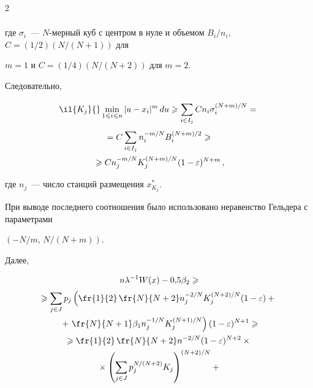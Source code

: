 \begin{multicols}{2}
\begin{multline*}
\end{multline*}


где $\sigma_i$~--- $N$-мерный куб с центром в нуле и объемом $B_i/n_i$, $C=(1/2)(N/(N+1))$ для


$m=1$ и $C=(1/4) (N/(N+2))$ для $m=2$.





Следовательно,


\begin{multline*}


\il{K_j}{}\minl{1\leqslant i\leqslant n}|u-x_i|^m\,du \geqslant


\suml{i\in I_j}{}C n_i \sigma_i^{(N+m)/N}= {}\\


{}=


C\suml{i\in I_j}{}n_i^{-m/N}B_i^{(N+m)/2}\geqslant {}\\


{}\geqslant


Cn_j^{-m/N}K_j^{(N+m)/N}(1-\varepsilon)^{N+m}\,,


\end{multline*}


где $n_j$~--- число станций размещения $x_{K_j}^*$.





При выводе последнего соотношения было использовано неравенство Гельдера с параметрами


$(-N/m,\, N/(N+m))$.


Далее,


\begin{multline*}


n\lambda^{-1}W(x)-0{,}5\beta_2\geqslant\\


\geqslant


\suml{j\in J}{}p_j \left(\fr{1}{2}\,\fr{N}{N+2} n_j^{-2/N}K_j^{(N+2)/N}(1-\varepsilon) +{}\right.\\


{}+\left.


\fr{N}{N+1}\beta_1 n_j^{-1/N}K_j^{(N+1)/N}\right)(1-\varepsilon)^{N+1}\geqslant\\


\geqslant \fr{1}{2}\,\fr{N}{N+2}n^{-2/N}(1-\varepsilon)^{N+2}\times{}\\


{}\times \left(


\suml{j\in J}{}p_j^{N/(N+2)}K_j\right)^{(N+2)/N} +{}\\



\end{multline*}
\end{multicols}
